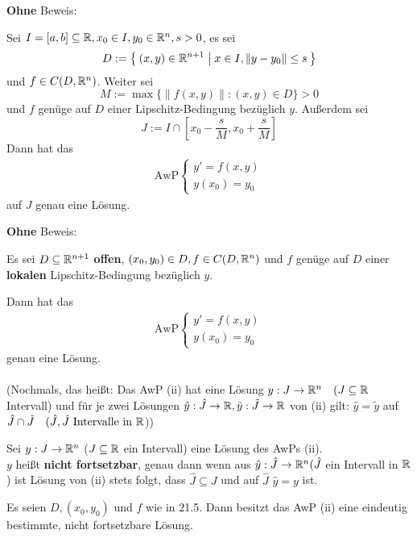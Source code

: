 \documentclass[a4paper,oneside,DIV15,BCOR12mm,chapterprefix=true,headings=onelinechapter]{scrbook}
\begin{document}
\textbf{Ohne} Beweis:
\begin{satz}
Sei $I=[a,b] \subseteq \mathbb{R}, x_0 \in I, y_0 \in \mathbb{R}^n, s > 0$, es sei
\[D := \Set{(x,y)\in\ensuremath{\mathbb{R}}^{n+1} | x \in I, \|y-y_0\| \leq s}\] 
und $f \in C(D,\mathbb{R}^n)$. Weiter sei 
\[M := \max\{\|f(x,y)\| : (x,y) \in D \} > 0\] 
und $f$ genüge auf $D$ einer Lipschitz-Bedingung bezüglich $y$. 
Außerdem sei 
\[J := I \cap \left [x_0 - \frac{s}{M}, x_0 + \frac{s}{M} \right ]\]
Dann hat das
\begin{align*}
\text{AwP}
\begin{cases}
y' = f(x,y)\\
y(x_0) = y_0
\end{cases}
\label{(ii)}
\end{align*}
auf \(J\) genau eine Lösung.
\end{satz}

\textbf{Ohne} Beweis:
\begin{satz}
Es sei $D \subseteq \mathbb{R}^{n+1}$ \textbf{offen}, $(x_0, y_0) \in D, f\in C(D, \mathbb{R}^n)$ und $f$ genüge auf $D$ einer \textbf{lokalen} Lipschitz-Bedingung bezüglich $y$.

Dann hat das
\begin{align*}
\text{AwP}
\begin{cases}
y' = f(x,y)\\
y(x_0) = y_0
\end{cases}
\label{(ii)}
\end{align*}
genau eine Lösung.
\\
\\
(Nochmals, das heißt: Das AwP (ii) hat eine Lösung $y: J \to \mathbb{R}^n\quad(J \subseteq \mathbb{R}$ 
Intervall) und für je zwei Lösungen $\hat y : \hat J \to \mathbb{R}, \tilde y : \tilde J \to \mathbb{R}$ 
von (ii) gilt: $\hat y = \tilde y$ auf $\hat J \cap \tilde J \quad (\hat J, \tilde J \text{ Intervalle in } \mathbb{R}$))
\end{satz}

\begin{definition}
Sei $y: J \to \mathbb{R}^n$ ($J \subseteq \mathbb{R}$ ein Intervall) eine Lösung des AwPs (ii).\\
\(y\) heißt \textbf{nicht fortsetzbar}, genau dann wenn aus $\hat y : \hat J \to \mathbb{R}^n 
(\hat J$ ein Intervall in $\mathbb{R}$) ist Lösung von (ii) stets folgt, dass $\hat J \subseteq J$ 
und auf $\hat J$ $\hat y = y$ ist.
\end{definition}

\begin{satz}
Es seien $D, (x_0, y_0)$ und $f$ wie in 21.5. Dann besitzt das AwP (ii) eine eindeutig bestimmte, nicht fortsetzbare Lösung.
\end{satz}
\end{document}
